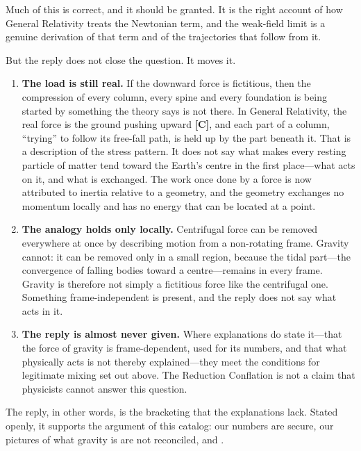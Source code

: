\documentclass[11pt,a4paper]{article}
\newcommand{\reg}[1]{\textsf{\small\textbf{[#1]}}}
\newcommand{\RC}{\reg{C}}
\begin{document}
Much of this is correct, and it should be granted. It is the right account of how General Relativity treats the Newtonian term, and the weak-field limit is a genuine derivation of that term and of the trajectories that follow from it.

But the reply does not close the question. It moves it.

\begin{enumerate}
  \item \textbf{The load is still real.} If the downward force is fictitious, then the compression of every column, every spine and every foundation is being started by something the theory says is not there. In General Relativity, the real force is the ground pushing upward \RC{}, and each part of a column, ``trying'' to follow its free-fall path, is held up by the part beneath it. That is a description of the stress pattern. It does not say what makes every resting particle of matter tend toward the Earth's centre in the first place---what acts on it, and what is exchanged. The work once done by a force is now attributed to inertia relative to a geometry, and the geometry exchanges no momentum locally and has no energy that can be located at a point. 
  \item \textbf{The analogy holds only locally.} Centrifugal force can be removed everywhere at once by describing motion from a non-rotating frame. Gravity cannot: it can be removed only in a small region, because the tidal part---the convergence of falling bodies toward a centre---remains in every frame. Gravity is therefore not simply a fictitious force like the centrifugal one. Something frame-independent is present, and the reply does not say what acts in it.
  \item \textbf{The reply is almost never given.} Where explanations do state it---that the force of gravity is frame-dependent, used for its numbers, and that what physically acts is not thereby explained---they meet the conditions for legitimate mixing set out above. The Reduction Conflation is not a claim that physicists cannot answer this question. 
\end{enumerate}

The reply, in other words, is the bracketing that the explanations lack. Stated openly, it supports the argument of this catalog: our numbers are secure, our pictures of what gravity is are not reconciled, and .
\end{document}
